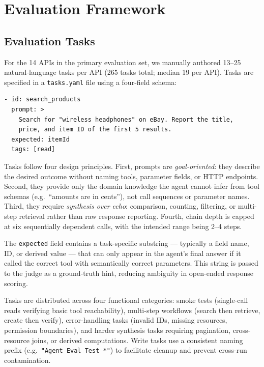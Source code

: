 \documentclass[12pt]{report}
\begin{document}
\section{Evaluation Framework}

\subsection{Evaluation Tasks}

For the 14 APIs in the primary evaluation set, we manually authored 13--25
natural-language tasks per API (265 tasks total; median 19 per API). Tasks
are specified in a \texttt{tasks.yaml} file using a four-field schema:

\begin{verbatim}
- id: search_products
  prompt: >
    Search for "wireless headphones" on eBay. Report the title,
    price, and item ID of the first 5 results.
  expected: itemId
  tags: [read]
\end{verbatim}

\noindent
Tasks follow four design principles. First, prompts are \emph{goal-oriented}:
they describe the desired outcome without naming tools, parameter fields, or
HTTP endpoints. Second, they provide only the domain knowledge the agent
cannot infer from tool schemas (e.g.\ ``amounts are in cents''), not call
sequences or parameter names. Third, they require \emph{synthesis over echo}:
comparison, counting, filtering, or multi-step retrieval rather than raw
response reporting. Fourth, chain depth is capped at six sequentially
dependent calls, with the intended range being 2--4 steps.

The \texttt{expected} field contains a task-specific substring --- typically
a field name, ID, or derived value --- that can only appear in the agent's
final answer if it called the correct tool with semantically correct
parameters. This string is passed to the judge as a ground-truth hint,
reducing ambiguity in open-ended response scoring.

Tasks are distributed across four functional categories: smoke tests
(single-call reads verifying basic tool reachability), multi-step workflows
(search then retrieve, create then verify), error-handling tasks (invalid IDs,
missing resources, permission boundaries), and harder synthesis tasks
requiring pagination, cross-resource joins, or derived computations. Write
tasks use a consistent naming prefix (e.g.\ \texttt{"Agent Eval Test *"})
to facilitate cleanup and prevent cross-run contamination.
\end{document}
